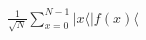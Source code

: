 \documentclass[preview]{standalone}
\begin{document}
\begin{align*}
\frac{1}{\sqrt{N}} \sum_{x=0}^{N-1} |x\langle |f(x)\langle
\end{align*}
\end{document}
